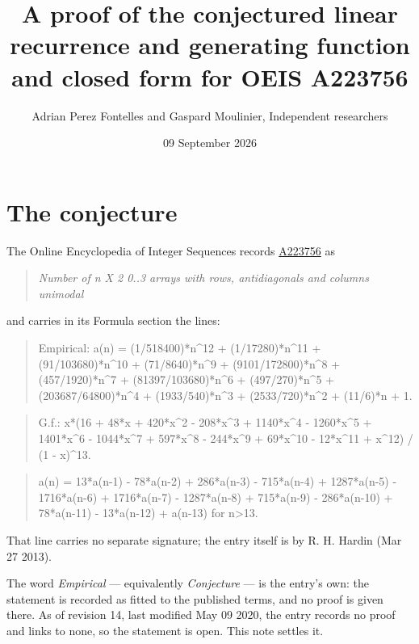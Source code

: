 \documentclass[11pt]{article}
\title{A proof of the conjectured linear recurrence and generating function and closed form for OEIS A223756}
\author{Adrian Perez Fontelles and Gaspard Moulinier, Independent researchers}
\date{09 September 2026}
\theoremstyle{definition}
\begin{document}
\maketitle
\section{The conjecture}

The Online Encyclopedia of Integer Sequences records \href{https://oeis.org/A223756}{A223756} as

\begin{quote}\itshape Number of n X 2 0..3 arrays with rows, antidiagonals and columns unimodal\end{quote}

and carries in its Formula section the lines:

\begin{quote}\ttfamily Empirical: a(n) = (1/518400)*n\textasciicircum{}12 + (1/17280)*n\textasciicircum{}11 + (91/103680)*n\textasciicircum{}10 + (71/8640)*n\textasciicircum{}9 + (9101/172800)*n\textasciicircum{}8 + (457/1920)*n\textasciicircum{}7 + (81397/103680)*n\textasciicircum{}6 + (497/270)*n\textasciicircum{}5 + (203687/64800)*n\textasciicircum{}4 + (1933/540)*n\textasciicircum{}3 + (2533/720)*n\textasciicircum{}2 + (11/6)*n + 1.\end{quote}

\begin{quote}\ttfamily G.f.: x*(16 + 48*x + 420*x\textasciicircum{}2 - 208*x\textasciicircum{}3 + 1140*x\textasciicircum{}4 - 1260*x\textasciicircum{}5 + 1401*x\textasciicircum{}6 - 1044*x\textasciicircum{}7 + 597*x\textasciicircum{}8 - 244*x\textasciicircum{}9 + 69*x\textasciicircum{}10 - 12*x\textasciicircum{}11 + x\textasciicircum{}12) / (1 - x)\textasciicircum{}13.\end{quote}

\begin{quote}\ttfamily a(n) = 13*a(n-1) - 78*a(n-2) + 286*a(n-3) - 715*a(n-4) + 1287*a(n-5) - 1716*a(n-6) + 1716*a(n-7) - 1287*a(n-8) + 715*a(n-9) - 286*a(n-10) + 78*a(n-11) - 13*a(n-12) + a(n-13) for n>13.\end{quote}

That line carries no separate signature; the entry itself is by R. H. Hardin (Mar 27 2013).

The word {\itshape Empirical} --- equivalently {\itshape Conjecture} --- is the entry's own: the statement is recorded as fitted to the published terms, and no proof is given there. As of revision 14, last modified May 09 2020, the entry records no proof and links to none, so the statement is open. This note settles it.
\end{document}
